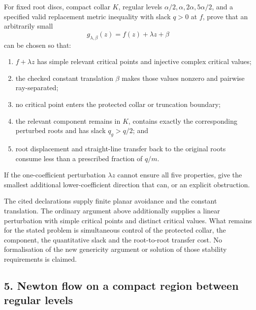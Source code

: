 \begin{problem}\label{prob:perturb1041}
For fixed root discs, compact collar $K$, regular levels
$\alpha/2,\alpha,2\alpha,5\alpha/2$, and a specified valid replacement metric
inequality with slack $q>0$ at $f$, prove that an arbitrarily small
\[
 g_{\lambda,\beta}(z)=f(z)+\lambda z+\beta
\]
can be chosen so that:

\begin{enumerate}
\item $f+\lambda z$ has simple relevant critical points and injective complex
critical values;
\item the checked constant translation $\beta$ makes those values nonzero and
pairwise ray-separated;
\item no critical point enters the protected collar or truncation boundary;
\item the relevant component remains in $K$, contains exactly the corresponding
perturbed roots and has slack $q_g>q/2$; and
\item root displacement and straight-line transfer back to the original roots
consume less than a prescribed fraction of $q/m$.
\end{enumerate}

If the one-coefficient perturbation $\lambda z$ cannot ensure all five
properties, give the smallest additional lower-coefficient direction that can,
or an explicit obstruction.
\end{problem}

The cited declarations supply finite planar avoidance and the constant
translation. The ordinary argument above additionally supplies a linear
perturbation with simple critical points and distinct critical values.
What remains for the stated problem is simultaneous control of the
protected collar, the component, the quantitative slack and the
root-to-root transfer cost. No formalisation of the new genericity
argument or solution of those stability requirements is claimed.

\subsection*{5. Newton flow on a compact region between regular levels}

